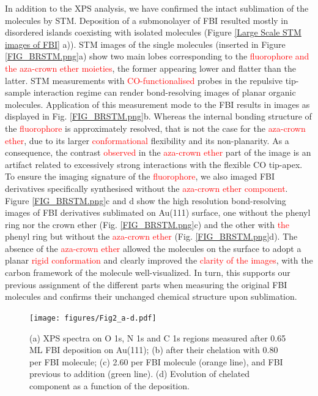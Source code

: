 \documentclass[aps,prl,reprint,longbibliography,superscriptaddress, english]{revtex4-1}
\begin{document}
In addition to the XPS analysis, we have confirmed the intact sublimation of the molecules by STM. Deposition of a submonolayer of FBI resulted mostly in disordered islands coexisting with isolated molecules (Figure \ref{Large Scale STM images of FBI} a)). STM images of the single molecules (inserted in Figure  \ref{FIG_BRSTM.png}a) show two main lobes corresponding to the \textcolor{red}{fluorophore and the aza-crown ether moieties}, the former appearing lower and flatter than the latter. STM measurements with \textcolor{red}{CO-functionalised} probes in the repulsive tip-sample interaction regime can render bond-resolving images of planar organic molecules.\cite{gross_recent_2011,gross_atomic_2018} Application of this measurement mode to the FBI results in images as displayed in Fig. \ref{FIG_BRSTM.png}b. Whereas the internal bonding structure of the \textcolor{red}{fluorophore} is approximately resolved, that is not the case for the \textcolor{red}{aza-crown ether}, due to its larger \textcolor{red}{conformational} flexibility and its non-planarity. As a consequence, the contrast \textcolor{red}{observed} in the \textcolor{red}{aza-crown ether} part of the image is an artifact related to excessively strong interactions with the flexible CO tip-apex.\cite{moll_mechanisms_2010,hapala_mechanism_2014} To ensure the imaging signature of the \textcolor{red}{fluorophore}, we also imaged FBI derivatives specifically synthesised without the \textcolor{red}{aza-crown ether component}. Figure  \ref{FIG_BRSTM.png}c and d show the high resolution bond-resolving images of FBI derivatives sublimated on Au(111) surface, one without the phenyl ring nor the crown ether (Fig. \ref{FIG_BRSTM.png}c)  and the other with \textcolor{red}{the} phenyl ring but without the \textcolor{red}{aza-crown ether} (Fig. \ref{FIG_BRSTM.png}d). The absence of the \textcolor{red}{aza-crown ether} allowed the molecules on the surface to adopt a planar \textcolor{red}{rigid conformation} and clearly improved the \textcolor{red}{clarity of the images}, with the carbon framework of the molecule well-visualized. In turn, this supports our previous assignment of the different parts when measuring the original FBI molecules and confirms their unchanged chemical structure upon sublimation.  


\begin{figure}[ht!]
	\texttt{[image: figures/Fig2\_a-d.pdf]}
	\caption{\label{XPS_FBI_Au(111)} 
    (a) XPS spectra on O 1s, N 1s and C 1s regions measured after 0.65 ML FBI deposition on Au(111); (b) after their chelation with 0.80 \Bapp per FBI molecule; (c) 2.60 \Nap per FBI molecule (orange line), and FBI previous to \Nap addition (green line). (d) Evolution of chelated component as a function of the \Bapp deposition.}
\end{figure}  
\end{document}
